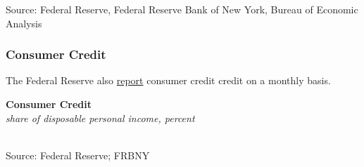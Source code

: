 \documentclass{report}
\makeatletter
\newcommand{\tbllink}[1]{\href{https://raw.githubusercontent.com/bdecon/US-chartbook/master/chartbook/data/#1}{\faTable}}
\newcommand*\short[1]{\expandafter\@gobbletwo\number\numexpr#1\relax}
\newcommand{\stdnode}[3]{\node[below, align=left, shift=({#1,#2})]{#3};}
\newcommand{\dateaxisticks}{
		date coordinates in=x, axis line style={draw=none},
		xmax={2021-06-15},
		max space between ticks=40,	    
		xtick={{1990-01-01}, {1992-01-01}, {1994-01-01}, 
			{1996-01-01}, {1998-01-01}, {2000-01-01}, 
			{2002-01-01}, {2004-01-01}, {2006-01-01},
			{2008-01-01}, {2010-01-01}, {2012-01-01}, {2014-01-01},
		    {2016-01-01}, {2018-01-01}, {2020-01-01}},
		minor xtick={{1989-01-01}, {1991-01-01}, {1993-01-01},
			{1995-01-01}, {1997-01-01}, {1999-01-01}, 
			{2001-01-01}, {2003-01-01}, {2005-01-01}, {2007-01-01},
		    {2009-01-01}, {2011-01-01}, {2013-01-01}, {2015-01-01},
		    {2017-01-01}, {2019-01-01}, {2021-01-01}},
		enlarge y limits={0.06}, enlarge x limits={0.01},
		}
\newcommand{\bbar}[2]{extra #1 ticks = {{#2}}, extra #1 tick labels = ,
		extra #1 tick style = {grid=major, grid style={thick, black!25}},}
\newcommand{\thinline}[4]{\addplot[no markers, color=#1] 
		table [x=#2, y=#3, col sep=comma] {#4};	}
\newcommand{\thickline}[4]{\addplot[ultra thick, no markers, color=#1] 
		table [x=#2, y=#3, col sep=comma] {#4};	}
\newcommand{\rbars}{
		\fill[color=black!10] (axis cs:{1990-07-01},\pgfkeysvalueof{/pgfplots/ymin}) rectangle 
			(axis cs:{1991-03-01}, \pgfkeysvalueof{/pgfplots/ymax});
		\fill[color=black!10] (axis cs:{2007-12-01},\pgfkeysvalueof{/pgfplots/ymin}) rectangle 
			(axis cs:{2009-07-01}, \pgfkeysvalueof{/pgfplots/ymax});
		\fill[color=black!10] (axis cs:{2001-03-01},\pgfkeysvalueof{/pgfplots/ymin}) rectangle 
			(axis cs:{2001-11-01}, \pgfkeysvalueof{/pgfplots/ymax});
		\fill[color=black!10] (axis cs:{2020-02-01},\pgfkeysvalueof{/pgfplots/ymin}) rectangle 
			(axis cs:{2021-06-15}, \pgfkeysvalueof{/pgfplots/ymax});}
\makeatother
\begin{document}
{\begin{minipage}{0.76\textwidth}
\footnotesize{Source: Federal Reserve, Federal Reserve Bank of New York, Bureau of Economic Analysis}
\end{minipage}
\newpage
\begin{minipage}{0.76\textwidth}
\subsubsection*{\color{black!70} \seriffont Consumer Credit}

\small The Federal Reserve also \href{https://www.federalreserve.gov/releases/g19/current/default.htm}{report} consumer credit credit on a monthly basis. 


\vspace{1mm}

\normalsize \textbf{Consumer Credit}\\
\footnotesize{\textit{share of disposable personal income, percent}}\\
\hspace*{-2mm} \\
\footnotesize{Source: Federal Reserve; FRBNY} \hfill \tbllink{cc_dpi_monthly.csv}
\end{minipage}
\vspace{3mm}

}
\end{document}
